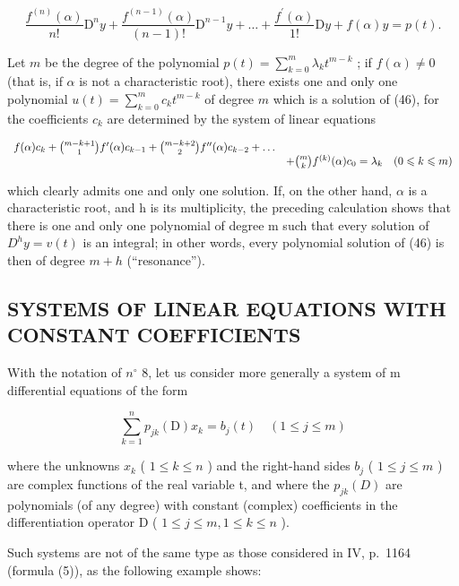 \[
\frac {f ^ {(n)} (\alpha)}{n !} \mathrm{D} ^ {n} y + \frac {f ^ {(n - 1)} (\alpha)}{(n - 1) !} \mathrm{D} ^ {n - 1} y + \dots + \frac {f ^ {\prime} (\alpha)}{1 !} \mathrm{D} y + f (\alpha) y = p (t).\tag{46}
\]

Let \(m\) be the degree of the polynomial \(p(t) = \sum_{k=0}^{m} \lambda_k t^{m-k}\) ; if \(f(\alpha) \neq 0\) (that is, if \(\alpha\) is not a characteristic root), there exists one and only one polynomial \(u(t) = \sum_{k=0}^{m} c_k t^{m-k}\) of degree \(m\) which is a solution of (46), for the coefficients \(c_k\) are determined by the system of linear equations

\[
\begin{array}{r l} f (\alpha) c _ {k} + \binom {m - k + 1} {1} f ^ {\prime} (\alpha) c _ {k - 1} + \binom {m - k + 2} {2} f ^ {\prime \prime} (\alpha) c _ {k - 2} + \dots \\ & + \binom {m} {k} f ^ {(k)} (\alpha) c _ {0} = \lambda_ {k} \quad (0 \leqslant k \leqslant m) \end{array}
\]

which clearly admits one and only one solution. If, on the other hand, \(\alpha\) is a characteristic root, and h is its multiplicity, the preceding calculation shows that there is one and only one polynomial of degree m such that every solution of \(D^{h}y = v(t)\) is an integral; in other words, every polynomial solution of (46) is then of degree \(m + h\) (``resonance'').

\subsection{SYSTEMS OF LINEAR EQUATIONS WITH CONSTANT COEFFICIENTS}

With the notation of \(n^{\circ}\) 8, let us consider more generally a system of m differential equations of the form

\[
\sum_ {k = 1} ^ {n} p _ {j k} (\mathrm{D}) x _ {k} = b _ {j} (t) \quad (1 \leqslant j \leqslant m)\tag{47}
\]

where the unknowns \(x_{k}\) ( \(1 \leqslant k \leqslant n\) ) and the right-hand sides \(b_{j}\) ( \(1 \leqslant j \leqslant m\) ) are complex functions of the real variable t, and where the \(p_{jk}(D)\) are polynomials (of any degree) with constant (complex) coefficients in the differentiation operator D ( \(1 \leqslant j \leqslant m, 1 \leqslant k \leqslant n\) ).

Such systems are not of the same type as those considered in IV, p.~1164 (formula (5)), as the following example shows:

